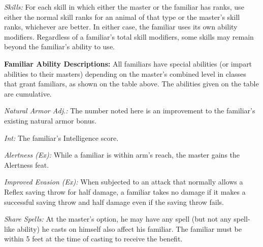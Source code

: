 \textit{Skills:} For each skill in which either the master or the familiar has ranks, use either the normal skill ranks for an animal of that type or the master's skill ranks, whichever are better. In either case, the familiar uses its own ability modifiers. Regardless of a familiar's total skill modifiers, some skills may remain beyond the familiar's ability to use.



\textbf{Familiar Ability Descriptions:} All familiars have special abilities (or impart abilities to their masters) depending on the master's combined level in classes that grant familiars, as shown on the table above. The abilities given on the table are cumulative.

\textit{Natural Armor Adj.:} The number noted here is an improvement to the familiar's existing natural armor bonus.

\textit{Int:} The familiar's Intelligence score.

\textit{Alertness (Ex):} While a familiar is within arm's reach, the master gains the Alertness feat.

\textit{Improved Evasion (Ex):} When subjected to an attack that normally allows a Reflex saving throw for half damage, a familiar takes no damage if it makes a successful saving throw and half damage even if the saving throw fails.

\textit{Share Spells:} At the master's option, he may have any spell (but not any spell-like ability) he casts on himself also affect his familiar. The familiar must be within 5 feet at the time of casting to receive the benefit.

